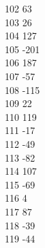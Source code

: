 { 102	63 \\
 103	26 \\
 104	127 \\
 105	-201 \\
 106	187 \\
 107	-57 \\
 108	-115 \\
 109	22 \\
 110	119 \\
 111	-17 \\
 112	-49 \\
 113	-82 \\
 114	107 \\
 115	-69 \\
 116	4 \\
 117	87 \\
 118	-39 \\
 119	-44 \\
}
